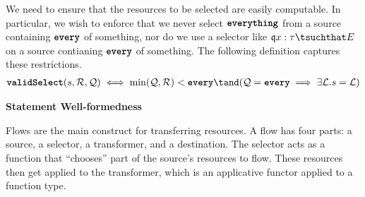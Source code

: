 \documentclass[dvipsnames, usenames, sigconf]{acmart}
\begin{document}
We need to ensure that the resources to be selected are easily computable.
In particular, we wish to enforce that we never select $\textbf{\texttt{everything}}$ from a source containing $\textbf{\texttt{every}}$ of something, nor do we use a selector like $\mathfrak{q} x : \tau \tsuchthat E$ on a source contianing $\textbf{\texttt{every}}$ of something.
The following definition captures these restrictions.
\begin{align*}
    \validSelect(s, \mathcal{R}, \mathcal{Q}) \iff \min(\mathcal{Q}, \mathcal{R}) < \every \tand (\mathcal{Q} = \every \implies \exists \mathcal{L}. s = \mathcal{L})
\end{align*}

 \textbf{Statement Well-formedness}


Flows are the main construct for transferring resources.
A flow has four parts: a source, a selector, a transformer, and a destination.
The selector acts as a function that ``chooses'' part of the source's resources to flow.
These resources then get applied to the transformer, which is an applicative functor applied to a function type.

\end{document}
